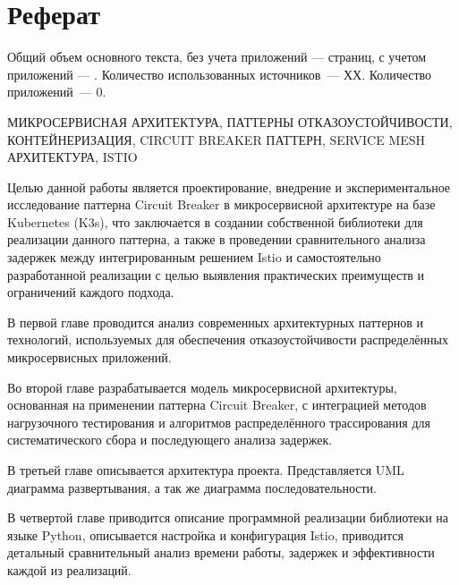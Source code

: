 \chapter*{Реферат}
\thispagestyle{plain}
Общий объем основного текста, без учета приложений ---
\pageref{end_of_main_text} страниц, с учетом приложений ---
\pageref{end_of_main_text}. Количество использованных источников~--- ХХ.
Количество приложений~--- 0.

\noindent \uppercase{микросервисная архитектура, паттерны отказоустойчивости, контейнеризация, circuit breaker паттерн, service mesh архитектура, Istio}

Целью данной работы является проектирование, внедрение и экспериментальное исследование паттерна Circuit Breaker в микросервисной архитектуре на базе Kubernetes (K3s), что заключается в создании собственной библиотеки для реализации данного паттерна, а также в проведении сравнительного анализа задержек между интегрированным решением Istio и самостоятельно разработанной реализации с целью выявления практических преимуществ и ограничений каждого подхода.

В первой главе проводится анализ современных архитектурных паттернов и технологий, используемых для обеспечения отказоустойчивости распределённых микросервисных приложений.

Во второй главе разрабатывается модель микросервисной архитектуры, основанная на применении паттерна Circuit Breaker, с интеграцией методов нагрузочного тестирования и алгоритмов распределённого трассирования для систематического сбора и последующего анализа задержек.

В третьей главе описывается архитектура проекта. Представляется UML диаграмма развертывания, а так же диаграмма последовательности.

В четвертой главе приводится описание программной реализации библиотеки на языке Python, описывается настройка и конфигурация Istio, приводится детальный сравнительный анализ времени работы, задержек и эффективности каждой из реализаций.




